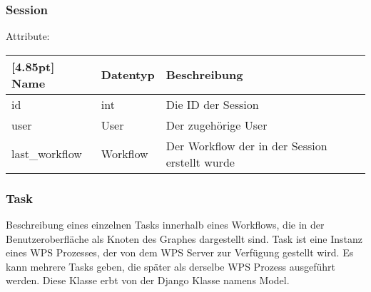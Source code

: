         \subsubsection{Session}
        
        Attribute:
		\begin{center}
        	\renewcommand{\arraystretch}{1.5}
            \setlength\tabcolsep{5pt}
        	\begin{tabularx}{\textwidth}{|l|l|X|}
        		\hline
                \rowcolor[gray]{0.75}[4.85pt]            		
        	    Name & Datentyp & Beschreibung \\ \hline
        	    id & int & Die ID der Session \\ \hline
        	    user & User & Der zugehörige User \\ \hline
        	    last_workflow & Workflow & Der Workflow der in der Session erstellt wurde \\ \hline
        	\end{tabularx}
        \end{center}

        \subsubsection{Task}
    		Beschreibung eines einzelnen Tasks innerhalb eines Workflows, die in der Benutzeroberfläche als Knoten des Graphes dargestellt sind. Task ist eine Instanz eines WPS Prozesses, der von dem WPS Server zur Verfügung gestellt wird. Es kann mehrere Tasks geben, die später als derselbe WPS Prozess ausgeführt werden. \newline
    		Diese Klasse erbt von der Django Klasse namens \glqq Model\grqq .
    		
